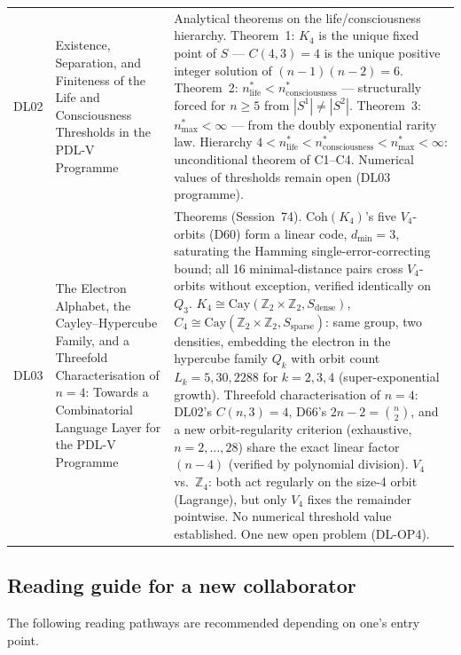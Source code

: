 \documentclass[11pt,a4paper]{article}
\theoremstyle{plain}
\theoremstyle{definition}
\theoremstyle{remark}
\begin{document}
\begin{longtable}{L{1.3cm}L{3.8cm}L{8.0cm}}
DL02 & Existence, Separation, and Finiteness of the Life and Consciousness Thresholds in the PDL-V Programme~\cite{DL02} & \textcolor{proofblue}{Analytical theorems} on the life/consciousness hierarchy. Theorem~1: $K_4$ is the unique fixed point of $S$ --- $C(4,3)=4$ is the unique positive integer solution of $(n-1)(n-2)=6$. Theorem~2: $n^*_{\mathrm{life}} < n^*_{\mathrm{consciousness}}$ --- structurally forced for $n \geq 5$ from $|S^1| \neq |S^2|$. Theorem~3: $n^*_{\mathrm{max}} < \infty$ --- from the doubly exponential rarity law. Hierarchy $4 < n^*_{\mathrm{life}} < n^*_{\mathrm{consciousness}} < n^*_{\mathrm{max}} < \infty$: unconditional theorem of C1--C4. Numerical values of thresholds remain open (DL03 programme).\\[0.4em]
DL03 & The Electron Alphabet, the Cayley--Hypercube Family, and a Threefold Characterisation of $n=4$: Towards a Combinatorial Language Layer for the PDL-V Programme~\cite{DL03} & \textcolor{proofblue}{Theorems} (Session~74). $\mathrm{Coh}(K_4)$'s five $V_4$-orbits (D60) form a linear code, $d_{\min}=3$, saturating the Hamming single-error-correcting bound; all 16 minimal-distance pairs cross $V_4$-orbits without exception, verified identically on $Q_3$. $K_4\cong\mathrm{Cay}(\mathbb{Z}_2\times\mathbb{Z}_2,S_{\mathrm{dense}})$, $C_4\cong\mathrm{Cay}(\mathbb{Z}_2\times\mathbb{Z}_2,S_{\mathrm{sparse}})$: same group, two densities, embedding the electron in the hypercube family $Q_k$ with orbit count $L_k=5,30,2288$ for $k=2,3,4$ (super-exponential growth). Threefold characterisation of $n=4$: DL02's $C(n,3)=4$, D66's $2n-2=\binom n2$, and a new orbit-regularity criterion (exhaustive, $n=2,\ldots,28$) share the exact linear factor $(n-4)$ (verified by polynomial division). $V_4$ vs.\ $\mathbb{Z}_4$: both act regularly on the size-4 orbit (Lagrange), but only $V_4$ fixes the remainder pointwise. No numerical threshold value established. One new open problem (DL-OP4).\\[0.4em]
\end{longtable}

\subsection{Reading guide for a new collaborator}
\label{subsec:readingguide}
The following reading pathways are recommended depending on one's entry point.
\end{document}
